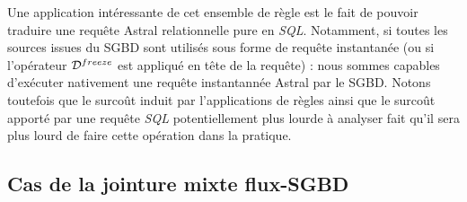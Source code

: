 Une application intéressante de cet ensemble de règle est le fait de pouvoir traduire une requête Astral relationnelle pure en \textit{SQL}. Notamment, si toutes les sources issues du SGBD sont utilisés sous forme de requête instantanée (ou si l'opérateur $\mathcal{D}^{freeze}$ est appliqué en tête de la requête) : nous sommes capables d'exécuter nativement une requête instantannée Astral par le SGBD. Notons toutefois que le surcoût induit par l'applications de règles ainsi que le surcoût apporté par une requête \textit{SQL} potentiellement plus lourde à analyser fait qu'il sera plus lourd de faire cette opération dans la pratique.

\subsection{Cas de la jointure mixte flux-SGBD}
